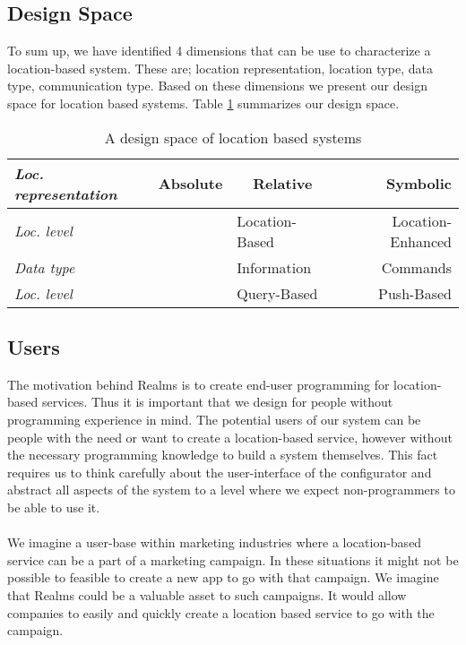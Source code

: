

\subsection{Design Space} %
\label{sub:design_space}
To sum up, we have identified 4 dimensions that can be use to characterize a location-based system. These are; location representation, location type, data type, communication type. Based on these dimensions we present our design space for location based systems. Table \ref{tab:designspace} summarizes our design space.
\begin{table}
\begin{tabular}{|l|l|c|r|}
  \hline
  \emph{Loc. representation} & Absolute & Relative & Symbolic \\ \hline
  \emph{Loc. level} & \multicolumn{1}{l}{} & \multicolumn{1}{l|}{Location-Based} & \multicolumn{1}{r|}{Location-Enhanced} \\ \hline
  \emph{Data type} & \multicolumn{1}{l}{} & \multicolumn{1}{l|}{Information} & \multicolumn{1}{r|}{Commands} \\ \hline
  \emph{Loc. level} & \multicolumn{1}{l}{} & \multicolumn{1}{l|}{Query-Based} & \multicolumn{1}{r|}{Push-Based} \\
  \hline
\end{tabular}
	\caption{A design space of location based systems}
  \label{tab:designspace}
\end{table}


\subsection{Users} %
\label{sub:users}
The motivation behind Realms is to create end-user programming for location-based services. Thus it is important that we design for people without programming experience in mind. The potential users of our system can be people with the need or want to create a location-based service, however without the necessary programming knowledge to build a system themselves. This fact requires us to think carefully about the user-interface of the configurator and abstract all aspects of the system to a level where we expect non-programmers to be able to use it. 
\\\\
We imagine a user-base within marketing industries where a location-based service can be a part of a marketing campaign. In these situations it might not be possible to feasible to create a new app to go with that campaign. We imagine that Realms could be a valuable asset to such campaigns. It would allow companies to easily and quickly create a location based service to go with the campaign. 


